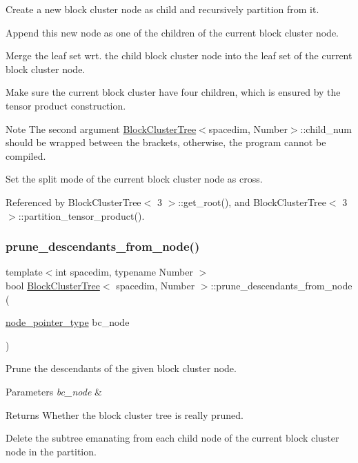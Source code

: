 Create a new block cluster node as child and recursively partition from it.

Append this new node as one of the children of the current block cluster node.

Merge the leaf set wrt. the child block cluster node into the leaf set of the current block cluster node.

Make sure the current block cluster have four children, which is ensured by the tensor product construction.


\begin{DoxyDescription}
\item[Note ]The second argument {\ttfamily \hyperlink{classBlockClusterTree}{Block\+Cluster\+Tree}$<$spacedim}, Number$>$\+::child\+\_\+num should be wrapped between the brackets, otherwise, the program cannot be compiled. 
\end{DoxyDescription}

Set the split mode of the current block cluster node as cross.

Referenced by Block\+Cluster\+Tree$<$ 3 $>$\+::get\+\_\+root(), and Block\+Cluster\+Tree$<$ 3 $>$\+::partition\+\_\+tensor\+\_\+product().

\mbox{\label{classBlockClusterTree_a6fd771b68a4c7195151f6dc02e8ec7e9}} 
\subsubsection{\texorpdfstring{prune\+\_\+descendants\+\_\+from\+\_\+node()}{prune\_descendants\_from\_node()}}
{\footnotesize\ttfamily template$<$int spacedim, typename Number $>$ \\
bool \hyperlink{classBlockClusterTree}{Block\+Cluster\+Tree}$<$ spacedim, Number $>$\+::prune\+\_\+descendants\+\_\+from\+\_\+node (\begin{DoxyParamCaption}\item[{\hyperlink{classTreeNode}{node\+\_\+pointer\+\_\+type}}]{bc\+\_\+node }\end{DoxyParamCaption})}

Prune the descendants of the given block cluster node. 
\begin{DoxyParams}{Parameters}
{\em bc\+\_\+node} & \\
\hline
\end{DoxyParams}
\begin{DoxyReturn}{Returns}
Whether the block cluster tree is really pruned. 
\end{DoxyReturn}
Delete the subtree emanating from each child node of the current block cluster node in the partition.

